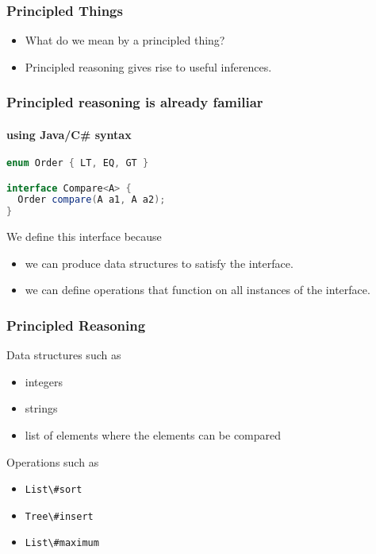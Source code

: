 \begin{frame}
\frametitle{Principled Things}
\begin{itemize}
\item<1-> What do we mean by a principled thing?
\item<2-> Principled reasoning gives rise to useful inferences.
\end{itemize}
\end{frame}

\begin{frame}[fragile]
\frametitle{Principled reasoning is already familiar}
\framesubtitle{using Java/C\# syntax}
\begin{lstlisting}[style=language,language=java]
enum Order { LT, EQ, GT }

interface Compare<A> {
  Order compare(A a1, A a2);
}
\end{lstlisting}
\begin{block}{We define this interface because}
\begin{itemize}
\item we can produce data structures to satisfy the interface.
\item we can define operations that function on all instances of the interface.
\end{itemize}
\end{block}
\end{frame}

\begin{frame}
\frametitle{Principled Reasoning}
\begin{block}{Data structures such as}
\begin{itemize}
\item integers
\item strings
\item list of elements where the elements can be compared
\end{itemize}
\end{block}
\begin{block}{Operations such as}
\begin{itemize}
\item \lstinline{List\#sort}
\item \lstinline{Tree\#insert}
\item \lstinline{List\#maximum}
\end{itemize}
\end{block}
\end{frame}

